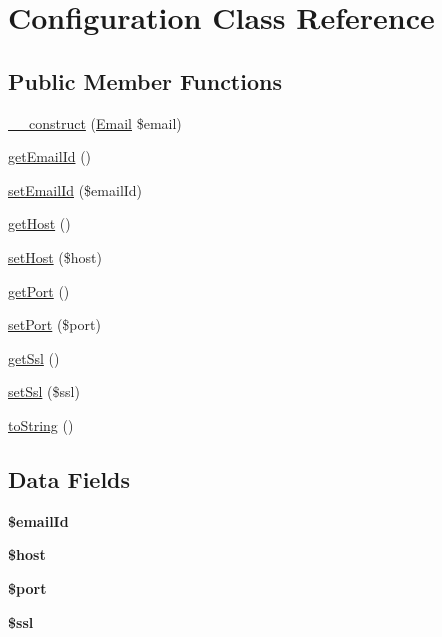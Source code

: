 \hypertarget{class_configuration}{\section{Configuration Class Reference}
\label{class_configuration}
}
\subsection*{Public Member Functions}
\begin{DoxyCompactItemize}
\item 
\hyperlink{class_configuration_a5fa131bd715830ad447074e92cea7584}{\+\_\+\+\_\+construct} (\hyperlink{class_email}{Email} \$email)
\item 
\hyperlink{class_configuration_a966e308323e810950d280159979e7828}{get\+Email\+Id} ()
\item 
\hyperlink{class_configuration_a4c429def3b76a499937ce606d6f5d79b}{set\+Email\+Id} (\$email\+Id)
\item 
\hyperlink{class_configuration_a39895a44b52bdced039e698588aaf18e}{get\+Host} ()
\item 
\hyperlink{class_configuration_a3796cc8d08abefbb14f15fde02b883a9}{set\+Host} (\$host)
\item 
\hyperlink{class_configuration_afd4db46d3c12f47f0bee19cd2101be64}{get\+Port} ()
\item 
\hyperlink{class_configuration_a000ce1ff20433f6ac9297e01c31d0678}{set\+Port} (\$port)
\item 
\hyperlink{class_configuration_a3d87ad620caa5069a63826daf10efbb6}{get\+Ssl} ()
\item 
\hyperlink{class_configuration_a6428dea4374f56ab1cb20f6e43c17239}{set\+Ssl} (\$ssl)
\item 
\hyperlink{class_configuration_a5558c5d549f41597377fa1ea8a1cefa3}{to\+String} ()
\end{DoxyCompactItemize}
\subsection*{Data Fields}
\begin{DoxyCompactItemize}
\item 
\hypertarget{class_configuration_ac1020fc3200062df461605a7b0c8d077}{{\bfseries \$email\+Id}}\label{class_configuration_ac1020fc3200062df461605a7b0c8d077}

\item 
\hypertarget{class_configuration_a711797613cb863ca0756df789c396bf2}{{\bfseries \$host}}\label{class_configuration_a711797613cb863ca0756df789c396bf2}

\item 
\hypertarget{class_configuration_aa0787efab4b22e8a212882f3409d4c77}{{\bfseries \$port}}\label{class_configuration_aa0787efab4b22e8a212882f3409d4c77}

\item 
\hypertarget{class_configuration_a10c5b56c377e4f3a08f69704e49c87e6}{{\bfseries \$ssl}}\label{class_configuration_a10c5b56c377e4f3a08f69704e49c87e6}

\end{DoxyCompactItemize}


